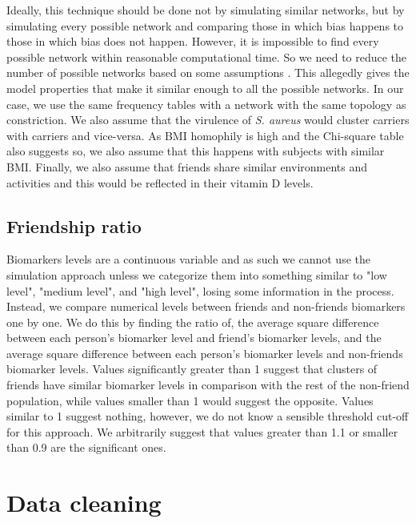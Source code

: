 Ideally, this technique should be done not by simulating similar networks, but by simulating every possible network and comparing those in which bias happens to those in which bias does not happen. However, it is impossible to find every possible network within reasonable computational time. So we need to reduce the number of possible networks based on some assumptions \cite{Bevan2017}. This allegedly gives the model properties that make it similar enough to all the possible networks. In our case, we use the same frequency tables with a network with the same topology as constriction. We also assume that the virulence of \textit{S. aureus} would cluster carriers with carriers and vice-versa. As BMI homophily is high and the Chi-square table also suggests so, we also assume that this happens with subjects with similar BMI. Finally, we also assume that friends share similar environments and activities and this would be reflected in their vitamin D levels.

\subsection{Friendship ratio}

Biomarkers levels are a continuous variable and as such we cannot use the simulation approach unless we categorize them into something similar to "low level", "medium level", and "high level", losing some information in the process. Instead, we compare numerical levels between friends and non-friends biomarkers one by one. We do this by finding the ratio of, the average square difference between each person's biomarker level and friend's biomarker levels, and the average square difference between each person's biomarker levels and non-friends biomarker levels. Values significantly greater than 1 suggest that clusters of friends have similar biomarker levels in comparison with the rest of the non-friend population, while values smaller than 1 would suggest the opposite. Values similar to 1 suggest nothing, however, we do not know a sensible threshold cut-off for this approach. We arbitrarily suggest that values greater than 1.1 or smaller than 0.9 are the significant ones.

\section{Data cleaning}

\label{datacleaningSection}


